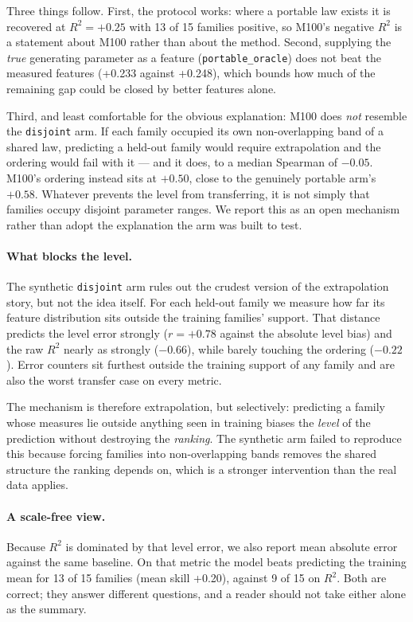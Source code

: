 \documentclass[11pt,a4paper]{article}
\newcommand{\num}[1]{#1}
\begin{document}
Three things follow. First, the protocol works: where a portable law exists it
is recovered at \(R^2 = +0.25\) with \num{13} of \num{15} families positive,
so M100's negative \(R^2\) is a statement about M100 rather than about the
method. Second, supplying the \emph{true} generating parameter as a feature
(\texttt{portable\_oracle}) does not beat the measured features
(\num{+0.233} against \num{+0.248}), which bounds how much of the remaining gap
could be closed by better features alone.

Third, and least comfortable for the obvious explanation: M100 does \emph{not}
resemble the \texttt{disjoint} arm. If each family occupied its own
non-overlapping band of a shared law, predicting a held-out family would require
extrapolation and the ordering would fail with it --- and it does, to a median
Spearman of \(-0.05\). M100's ordering instead sits at \(+0.50\), close to the
genuinely portable arm's \(+0.58\). Whatever prevents the level from
transferring, it is not simply that families occupy disjoint parameter ranges.
We report this as an open mechanism rather than adopt the explanation the arm
was built to test.

\paragraph{What blocks the level.} The synthetic \texttt{disjoint} arm rules
out the crudest version of the extrapolation story, but not the idea itself. For
each held-out family we measure how far its feature distribution sits outside
the training families' support. That distance predicts the level error strongly
(\(r=+0.78\) against the absolute level bias) and the raw \(R^2\) nearly as
strongly (\(-0.66\)), while barely touching the ordering (\(-0.22\)). Error
counters sit furthest outside the training support of any family and are also
the worst transfer case on every metric.

The mechanism is therefore extrapolation, but selectively: predicting a family
whose measures lie outside anything seen in training biases the \emph{level} of
the prediction without destroying the \emph{ranking}. The synthetic arm failed
to reproduce this because forcing families into non-overlapping bands removes
the shared structure the ranking depends on, which is a stronger intervention
than the real data applies.

\paragraph{A scale-free view.} Because \(R^2\) is dominated by that level
error, we also report mean absolute error against the same baseline. On that
metric the model beats predicting the training mean for \num{13} of \num{15}
families (mean skill \num{+0.20}), against \num{9} of \num{15} on \(R^2\).
Both are correct; they answer different questions, and a reader should not take
either alone as the summary.
\end{document}
